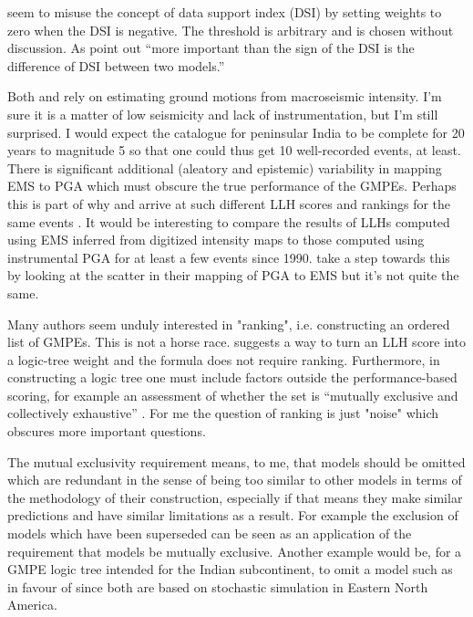 \documentclass{article}
\begin{document}
\cite{anbazhagan2015selection} seem to misuse the concept of data support index (DSI) \citep{delavaud2012toward} by setting weights to zero when the DSI is negative.
The threshold is arbitrary and is chosen without discussion.
As \cite{delavaud2012toward} point out ``more important
than the sign of the DSI is the difference of DSI between
two models.''

Both \cite{anbazhagan2015selection} and \cite{nath2011peak} rely on estimating ground motions from macroseismic intensity.
I'm sure it is a matter of low seismicity and lack of instrumentation, but I'm still surprised.
I would expect the catalogue for peninsular India to be complete for 20 years to magnitude 5 so that one could thus get 10 well-recorded events, at least.
There is significant additional (aleatory and epistemic) variability in mapping EMS to PGA which must obscure the true performance of the GMPEs.
 Perhaps this is part of why  \cite{anbazhagan2015selection} and \cite{nath2011peak} arrive at such different LLH scores and rankings for the same events \cite[][Table 5]{anbazhagan2015selection}.
It would be interesting to compare the results of LLHs computed using EMS inferred from digitized intensity maps to those computed using instrumental PGA for at least a few events since 1990.
\cite{nath2011peak} take a step towards this by looking at the scatter in their mapping of PGA to EMS but it's not quite the same.

Many authors \citep{scherbaum2009model, nath2011peak, delavaud2012toward, anbazhagan2015selection} seem unduly interested in "ranking", i.e. constructing an ordered list of GMPEs.
This is not a horse race.
\cite{scherbaum2009model} suggests a way to turn an LLH score into a logic-tree weight and the formula does not require ranking.
Furthermore, in constructing a logic tree one must include factors outside the performance-based scoring, for example an assessment of whether the set is ``mutually exclusive and collectively exhaustive'' \citep{bommer2008use}.
For me the question of ranking is just "noise" which obscures more important questions.

The mutual exclusivity requirement means, to me, that models should be omitted which are redundant in the sense of being too similar to other models in terms of the methodology of their construction, especially if that means they make similar predictions and have similar limitations as a result.
For example the exclusion of models which have been superseded \citep{cotton2006criteria} can be seen as an application of the requirement that models be mutually exclusive.
Another example would be, for a GMPE logic tree intended for the Indian subcontinent, to omit a model such as \cite{hwang1997attenuation} in favour of \cite{atkinson2006earthquake} since both are based on stochastic simulation in Eastern North America.
\end{document}

